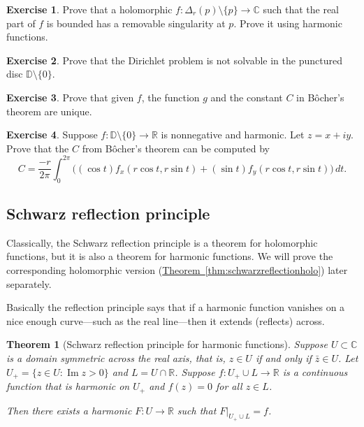 \documentclass[12pt,openany]{book}
\renewcommand{\Im}{\operatorname{Im}}
\newcommand{\C}{{\mathbb{C}}}
\newcommand{\R}{{\mathbb{R}}}
\newcommand{\D}{{\mathbb{D}}}
\theoremstyle{plain}
\newtheorem{thm}{Theorem}[section]
\theoremstyle{remark}
\theoremstyle{definition}
\newenvironment{exbox}{%
    \def\FrameCommand{\vrule width 1pt \relax\hspace{10pt}}%
    \MakeFramed{\advance\hsize-\width\FrameRestore}%
}{%
    \endMakeFramed
}
\theoremstyle{exercise}
\newtheorem{exercise}{Exercise}[section]
\theoremstyle{example}
\newcommand{\thmref}[1]{\hyperref[#1]{Theorem~\ref*{#1}}}
\begin{document}
\begin{exbox}
\begin{exercise}
Prove that a holomorphic $f \colon \Delta_r(p) \setminus \{ p \} \to \C$
such that the real part of $f$ is bounded has a removable singularity at $p$.
Prove it using harmonic functions.
\end{exercise}

\begin{exercise} \label{exercise:nodirichletsolpuncturedD}
Prove that the Dirichlet problem is not solvable in the punctured disc $\D
\setminus \{ 0 \}$.
\end{exercise}

\begin{exercise}
Prove that given $f$, the function $g$ and the constant $C$ in 
B\^{o}cher's theorem are unique.
\end{exercise}

\begin{exercise}
Suppose $f \colon \D \setminus \{ 0 \} \to \R$ is nonnegative and harmonic.
Let $z=x+iy$.  Prove that the $C$ from B\^{o}cher's theorem can be computed by
\begin{equation*}
C =  \frac{-r}{2\pi} \int_0^{2\pi}
\bigl(
(\cos t) f_x (r\cos t,r\sin t) +
(\sin t) f_y (r\cos t,r\sin t) 
\bigr) \, dt .
\end{equation*}
\end{exercise}
\end{exbox}

\subsection{Schwarz reflection principle}

Classically, the Schwarz reflection principle is a theorem for holomorphic
functions, but it is also a theorem for harmonic functions.
We will prove the corresponding holomorphic version
(\thmref{thm:schwarzreflectionholo}) later separately.

Basically the reflection principle says that if a harmonic function vanishes on a nice enough
curve---such as the real line---then it extends (reflects) across.

\begin{thm}[Schwarz reflection principle for harmonic functions]%
%
\label{thm:schwarzreflectionharm}
Suppose $U \subset \C$ is a domain symmetric across the real axis, that is,
$z \in U$ if and only if $\bar{z} \in U$.
Let $U_+ = \{ z \in U : \Im z > 0 \}$ and $L = U \cap \R$.
Suppose $f \colon U_+ \cup L \to \R$ is a continuous function that is
harmonic on $U_+$ and $f(z) = 0$ for all $z \in L$.

Then there exists a harmonic $F \colon U \to \R$ such that
$F|_{U_+ \cup L} = f$.
\end{thm}
\end{document}
